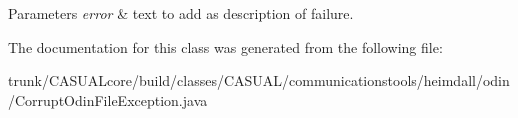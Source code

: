 \begin{DoxyParams}{Parameters}
{\em error} & text to add as description of failure. \\
\hline
\end{DoxyParams}


The documentation for this class was generated from the following file\-:\begin{DoxyCompactItemize}
\item 
trunk/\-C\-A\-S\-U\-A\-Lcore/build/classes/\-C\-A\-S\-U\-A\-L/communicationstools/heimdall/odin/Corrupt\-Odin\-File\-Exception.\-java\end{DoxyCompactItemize}
